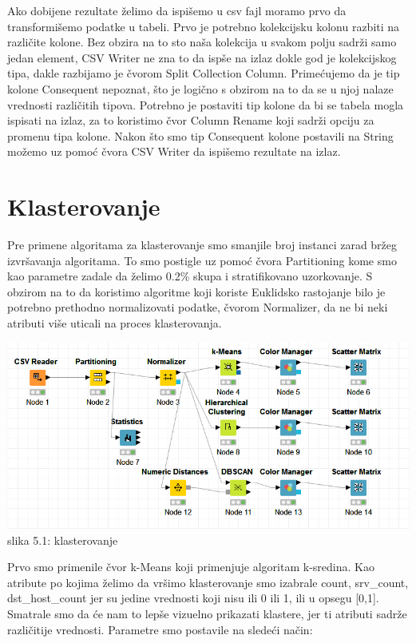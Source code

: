 \documentclass[10pt]{article}
\begin{document}
Ako dobijene rezultate \v zelimo da ispi\v semo u csv fajl moramo prvo da transformi\v semo podatke u tabeli. Prvo je potrebno kolekcijsku kolonu razbiti na razli\v cite kolone. Bez obzira na to sto na\v sa kolekcija u svakom polju sadr\v zi samo jedan element, CSV Writer ne zna to da isp\v se na izlaz dokle god je kolekcijskog tipa, dakle razbijamo je \v cvorom Split Collection Column. Prime\' cujemo da je tip kolone Consequent nepoznat, \v sto je logi\v cno s obzirom na to da se u njoj nalaze vrednosti razli\v citih tipova. Potrebno je postaviti tip kolone da bi se tabela mogla ispisati na izlaz, za to koristimo \v cvor Column Rename koji sadr\v zi opciju za promenu tipa kolone. Nakon \v sto smo tip Consequent kolone postavili na String mo\v zemo uz pomo\' c \v cvora CSV Writer da ispi\v semo rezultate na izlaz.

\section{Klasterovanje}

Pre primene algoritama za klasterovanje smo smanjile broj instanci zarad br\v zeg izvr\v savanja algoritama. To smo postigle uz pomo\' c \v cvora Partitioning kome smo kao parametre zadale da \v zelimo 0.2\% skupa i stratifikovano uzorkovanje. S obzirom na to da koristimo algoritme koji koriste Euklidsko rastojanje bilo je potrebno prethodno normalizovati podatke, \v cvorom Normalizer, da ne bi neki atributi vi\v se uticali na proces klasterovanja. 

\begin{center}
\includegraphics[width = \textwidth]{Klaster1}
slika 5.1: klasterovanje\\
\end{center}

Prvo smo primenile \v cvor k-Means koji primenjuje algoritam k-sredina. Kao atribute po kojima \v zelimo da vr\v simo klasterovanje smo izabrale count, srv\_count, dst\_host\_count jer su jedine vrednosti koji nisu ili 0 ili 1, ili u opsegu [0,1]. Smatrale smo da \' ce nam to lep\v se vizuelno prikazati klastere, jer ti atributi sadr\v ze razli\v citije vrednosti. Parametre smo postavile na slede\' ci na\v cin:
\end{document}
